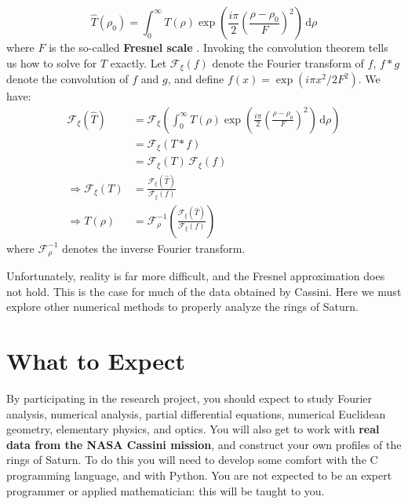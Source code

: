 \documentclass{article}
\begin{document}
        \begin{equation}
            \hat{T}(\rho_{0})
            =\int_{0}^{\infty}
            T(\rho)\exp\left(
                \frac{i\pi}{2}\left(\frac{\rho-\rho_{0}}{F}\right)^{2}
            \right)\,\textrm{d}\rho
        \end{equation}
        where $F$ is the so-called \textbf{Fresnel scale}
        \cite{Marouf1982TheoryOR}.
        Invoking the convolution theorem tells us how to solve for $T$ exactly.
        Let $\mathcal{F}_{\xi}(f)$ denote the Fourier transform of $f$,
        $f*g$ denote the convolution of $f$ and $g$, and define
        $f(x)=\exp(i\pi{x}^{2}/2F^{2})$. We have:
        \begin{align}
            \mathcal{F}_{\xi}(\hat{T})
            &=\mathcal{F}_{\xi}\left(
                \int_{0}^{\infty}
                T(\rho)\exp\left(
                    \frac{i\pi}{2}\left(\frac{\rho-\rho_{0}}{F}\right)^{2}
                \right)\,\textrm{d}\rho
            \right)\\
            &=\mathcal{F}_{\xi}(T*f)\\
            &=\mathcal{F}_{\xi}(T)\,\mathcal{F}_{\xi}(f)\\
            \Longrightarrow
            \mathcal{F}_{\xi}(T)
            &=\frac{\mathcal{F}_{\xi}(\hat{T})}{\mathcal{F}_{\xi}(f)}\\
            \Longrightarrow
            T(\rho)
            &=\mathcal{F}^{-1}_{\rho}\left(
                \frac{\mathcal{F}_{\xi}(\hat{T})}{\mathcal{F}_{\xi}(f)}
            \right)
        \end{align}
        where $\mathcal{F}^{-1}_{\rho}$ denotes the inverse Fourier transform.
        \par\hfill\par
        Unfortunately, reality is far more difficult,
        and the Fresnel approximation does not hold. This is the
        case for much of the data obtained by Cassini. Here we must explore
        other numerical methods to properly analyze the rings of Saturn.
    \section{What to Expect}
        By participating in the research project, you should expect to study
        Fourier analysis, numerical analysis, partial differential equations,
        numerical Euclidean geometry, elementary physics, and optics. You will
        also get to work with \textbf{real data from the NASA Cassini mission},
        and construct your own profiles of the rings of Saturn. To do this you
        will need to develop some comfort with the C programming language, and
        with Python. You are not expected to be an expert programmer or
        applied mathematician: this will be taught to you.
    \par\hfill\par
    
    
\end{document}
